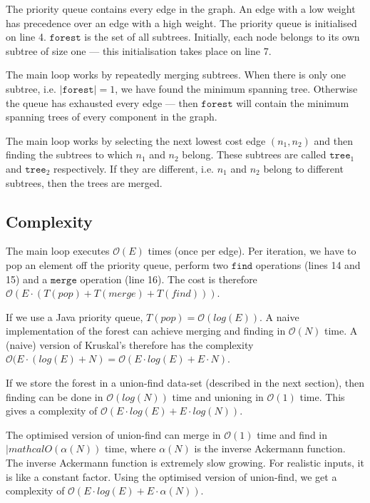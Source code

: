 \documentclass[a4paper,12pt]{article}
\newcommand{\kwa}[1]{\mathtt{#1}}
\begin{document}
\noindent
The priority queue contains every edge in the graph. An edge with a low weight has precedence over an edge with a high weight. The priority queue is initialised on line 4. $\kwa{forest}$ is the set of all subtrees. Initially, each node belongs to its own subtree of size one --- this initialisation takes place on line 7.

The main loop works by repeatedly merging subtrees. When there is only one subtree, i.e. $\kwa{ |forest|} = 1$, we have found the minimum spanning tree. Otherwise the queue has exhausted every edge --- then $\kwa{forest}$ will contain the minimum spanning trees of every component in the graph.

The main loop works by selecting the next lowest cost edge $(n_1, n_2)$ and then finding the subtrees to which $n_1$ and $n_2$ belong. These subtrees are called $\kwa{tree}_1$ and $\kwa{tree}_2$ respectively. If they are different, i.e. $n_1$ and $n_2$ belong to different subtrees, then the trees are merged.

\subsection{Complexity}

The main loop executes $\mathcal{O}(E)$ times (once per edge). Per iteration, we have to pop an element off the priority queue, perform two $\kwa{find}$ operations (lines 14 and 15) and a $\kwa{merge}$ operation (line 16). The cost is therefore $\mathcal{O}(E \cdot (T(pop) + T(merge) + T(find)))$.

If we use a Java priority queue, $T(pop) = \mathcal{O}(log(E))$. A naive implementation of the forest can achieve merging and finding in $\mathcal{O}(N)$ time. A (naive) version of Kruskal's therefore has the complexity $\mathcal{O}(E \cdot (log(E) + N) = \mathcal{O}(E \cdot log(E) + E \cdot N)$.

If we store the forest in a union-find data-set (described in the next section), then finding can be done in $\mathcal{O}(log(N))$ time and unioning in $\mathcal{O}(1)$ time. This gives a complexity of $\mathcal{O}(E \cdot log(E) + E \cdot log(N))$.

The optimised version of union-find can merge in $\mathcal{O}(1)$ time and find in $|mathcal{O}(\alpha(N))$ time, where $\alpha(N)$ is the inverse Ackermann function. The inverse Ackermann function is extremely slow growing. For realistic inputs, it is like a constant factor. Using the optimised version of union-find, we get a complexity of $\mathcal{O}(E \cdot log(E) + E \cdot \alpha(N))$.
\end{document}
